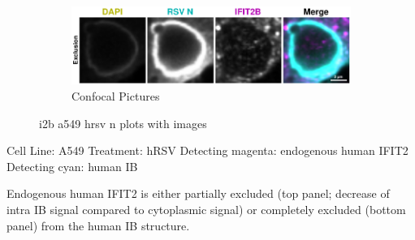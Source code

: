 \begin{figure}
    \begin{subfigure}{1\textwidth}
        \includegraphics[width=1\linewidth]{10. Chapter 5/Figs/01. Infection/02. IFIT2B/03. i2b a549 hrsv n.pdf} 
        \caption[]{Confocal Pictures}
    \end{subfigure}
    \caption[i2b a549 hrsv n plots with images]{i2b a549 hrsv n plots with images}
    \label{fig:i2b a549 hrsv n plots with images}
\end{figure}

Cell Line: A549 \newline
Treatment: hRSV \newline
Detecting magenta: endogenous human IFIT2  \newline
Detecting cyan: human IB \newline

Endogenous human IFIT2 is either partially excluded (top panel; decrease of intra IB signal compared to cytoplasmic signal) or completely excluded (bottom panel) from the human IB structure.


